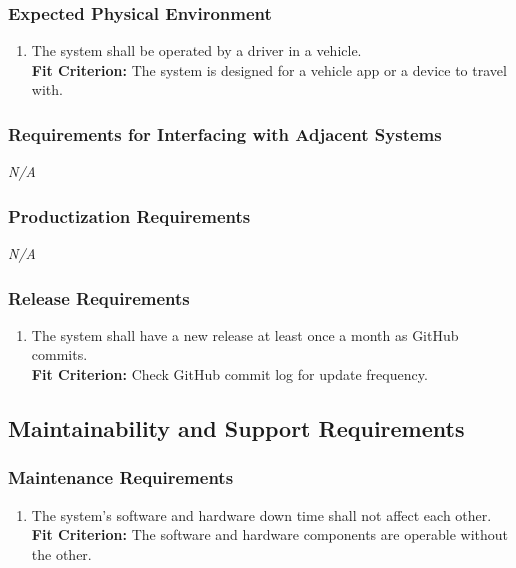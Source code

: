 \documentclass[12pt,letterpaper]{article}
\begin{document}
\subsubsection{Expected Physical Environment}
\begin{enumerate}[{OE}1.] 
    \item The system shall be operated by a driver in a vehicle. \label{pocnf4} \\
    \textbf{Fit Criterion:} The system is designed for a vehicle app or a device to travel with.
\end{enumerate}

\subsubsection{Requirements for Interfacing with Adjacent Systems}
\noindent \emph{N/A}

\subsubsection{Productization Requirements}
\noindent \emph{N/A}

\subsubsection{Release Requirements}
\begin{enumerate}[resume*] 
    \item The system shall have a new release at least once a month as GitHub commits.\\
    \textbf{Fit Criterion:} Check GitHub commit log for update frequency.
\end{enumerate}

\subsection{Maintainability and Support Requirements}
\subsubsection{Maintenance Requirements}
\begin{enumerate}[{MA}1.] 
    \item The system's software and hardware down time shall not affect each other.\\
    \textbf{Fit Criterion:} The software and hardware components are operable without the other.
\end{enumerate}
\end{document}
